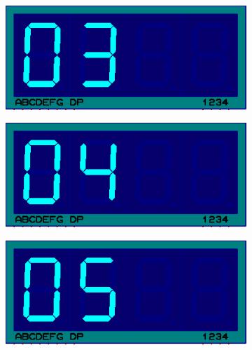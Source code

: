\documentclass{lab_sheet}
\begin{document}
\begin{figure}[H]
\begin{subfigure}{.33\textwidth}
      \label{fig:prob2-c}
      \caption{}
    \end{subfigure}
    \newline
    \begin{subfigure}{.33\textwidth}
      \centering
      \includegraphics[frame,width=.9\linewidth]{../Figures/d3}     
      \caption{}
      \label{fig:prob2-d}
    \end{subfigure}
    \begin{subfigure}{.33\textwidth}
      \centering
      \includegraphics[frame,width=.9\linewidth]{../Figures/d4}   
      \caption{}
      \label{fig:prob2-e}
    \end{subfigure}
    \begin{subfigure}{.33\textwidth}
      \centering
      \includegraphics[frame,width=.9\linewidth]{../Figures/d5}   
      \caption{}
      \label{fig:prob2-f}
    \end{subfigure}
    \newline
    \begin{subfigure}{.33\textwidth}

\end{subfigure}
\end{figure}
\end{document}
